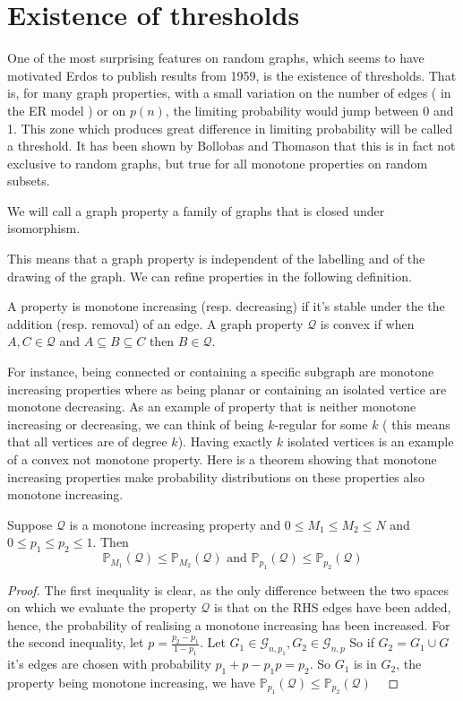 \section{Existence of thresholds}
One of the most surprising features on random graphs, which seems to have motivated Erdos to publish results from 1959, is the existence of thresholds. That is, for many graph properties, with a small variation on the number of edges ( in the ER model ) or on $p(n)$, the limiting probability would jump between 0 and 1.
This zone which produces great difference in limiting probability will be called a threshold.
It has been shown by Bollobas and Thomason that this is in fact not exclusive to random graphs, but true for all monotone properties on random subsets.
\begin{definition}
We will call a graph property a family of graphs that is closed under isomorphism.
\end{definition}
This means that a graph property is independent of the labelling and of the drawing of the graph.
We can refine properties in the following definition.
\begin{definition}
	A property is monotone increasing (resp. decreasing) if it's stable under the the addition (resp. removal) of an edge.
	A graph property $\mathcal{Q}$ is convex if when $ A,C \in \mathcal{Q}$ and $A\subseteq B\subseteq C$ then $B \in \mathcal{Q}$. 
\end{definition}
For instance, being connected or containing a specific subgraph are monotone increasing properties where as being planar or containing an isolated vertice are monotone decreasing. 
As an example of property that is neither monotone increasing or decreasing, we can think of being $k$-regular for some $k$ ( this means that all vertices are of degree $k$).
Having exactly $k$ isolated vertices is an example of a convex not monotone property.
\newline
Here is a theorem showing that monotone increasing properties make probability distributions on these properties also monotone increasing.
\begin{theorem}
	Suppose $\mathcal{Q}$ is a monotone increasing property and $0 \leq M_1 \leq M_2 \leq N$ and $0 \leq p_1 \leq p_2 \leq 1$.
	\newline
	Then
	$$\mathbb{P}_{M_1}(\mathcal{Q}) \leq  \mathbb{P}_{M_2}(\mathcal{Q}) \text{  and  } \mathbb{P}_{p_1}(\mathcal{Q}) \leq \mathbb{P}_{p_2}(\mathcal{Q})$$
\end{theorem}
\begin{proof}
	The first inequality is clear, as the only difference between the two spaces on which we evaluate the property $\mathcal{Q}$ is that on the RHS edges have been added, hence, the probability of realising a monotone increasing has been increased.
	\newline
	For the second inequality, let $p = \frac{p_2 - p_1}{1 - p_1}$. Let $G_1 \in \mathcal{G}_{n, p_1}, G_2 \in \mathcal{G}_{n, p}$
	\newline
	So if $G_2 = G_1 \cup G$ it's edges are chosen with probability $p_1 + p - p_1 p = p_2$. So $G_1$ is in $G_2$, the property being monotone increasing, we have $ \mathbb{P}_{p_1}(\mathcal{Q}) \leq \mathbb{P}_{p_2}(\mathcal{Q})$
\
\end{proof}

